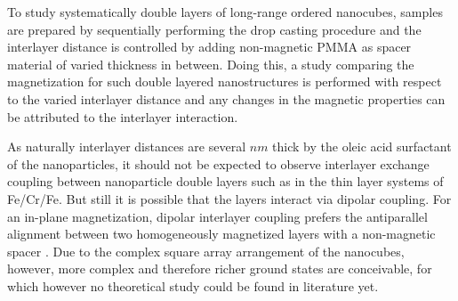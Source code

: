 \documentclass[\main/dresen_thesis.tex]{subfiles}
\begin{document}
  To study systematically double layers of long-range ordered nanocubes, samples are prepared by sequentially performing the drop casting procedure and the interlayer distance is controlled by adding non-magnetic PMMA as spacer material of varied thickness in between.
  Doing this, a study comparing the magnetization for such double layered nanostructures is performed with respect to the varied interlayer distance and any changes in the magnetic properties can be attributed to the interlayer interaction.

  As naturally interlayer distances are several $\unit{nm}$ thick by the oleic acid surfactant of the nanoparticles, it should not be expected to observe interlayer exchange coupling between nanoparticle double layers such as in the thin layer systems of Fe/Cr/Fe.
  But still it is possible that the layers interact via dipolar coupling.
  For an in-plane magnetization, dipolar interlayer coupling prefers the antiparallel alignment between two homogeneously magnetized layers with a non-magnetic spacer \cite{Labrune_2002_Dipol}.
  Due to the complex square array arrangement of the nanocubes, however, more complex and therefore richer ground states are conceivable, for which however no theoretical study could be found in literature yet.

  
                                                    
\end{document}
